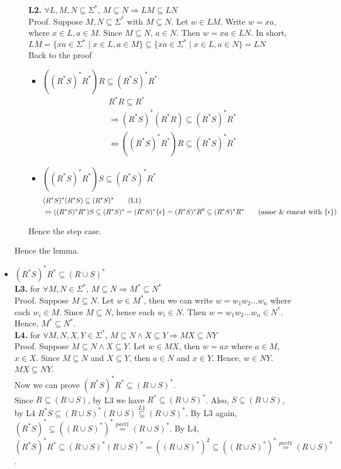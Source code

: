 \documentclass[12pt]{article}
\begin{document}
\begin{itemize}
\begin{itemize}
    \textbf{L2.} \(\forall L, M, N \subseteq \Sigma^*\), \(M \subseteq N \Rightarrow LM \subseteq LN\)\\
    Proof. Suppose \(M, N \subseteq \Sigma^*\) with \(M \subseteq N\). Let \(w \in LM\). Write \(w = xa\), where \(x \in L, a \in M\). Since \(M \subseteq N\), \(a \in N\). Then \(w = xa \in LN\). In short, \(LM = \{xa \in \Sigma^* \mid x \in L, a \in M\} \subseteq \{xa \in \Sigma^* \mid x \in L, a \in N\} = LN\)\\
    Back to the proof
    \begin{itemize}
      \item \(((R^*S)^*R^*)R \subseteq (R^*S)^*R^*\)
      \begin{align*}
        &R^*R \subseteq R^* \tag*{(L1)}\\
        &\Rightarrow (R^*S)^*(R^*R) \subseteq (R^*S)^*R^* \tag*{(L2)}\\
        &\Leftrightarrow ((R^*S)^*R^*)R \subseteq (R^*S)^*R^* \tag*{(associativity)}
      \end{align*}
      \item \(((R^*S)^*R^*)S \subseteq (R^*S)^*R^*\)
      \begin{align*}
        & (R^*S)^*(R^*S) \subseteq (R^*S)^* \tag*{(L1)}\\
        &\Leftrightarrow ((R^*S)^*R^*)S \subseteq (R^*S)^* = (R^*S)^*\{\epsilon\}
        = (R^*S)^*R^0 \subseteq (R^*S)^*R^*
        \tag*{(assoc \& concat with \(\{\epsilon\}\))}
      \end{align*}
    \end{itemize}
    Hence the step case. 
  \end{itemize}
  Hence the lemma.
  \item \((R^*S)^*R^* \subseteq (R \cup S)^*\)\\
  \textbf{L3.} for \(\forall M,N \in \Sigma^*\), \(M \subseteq N \Rightarrow M^* \subseteq N^*\)\\
  Proof. Suppose \(M \subseteq N\). Let \(w \in M^*\), then we can write \(w = w_1w_2...w_n\) where each \(w_i 
  \in M\). Since \(M \subseteq N\), hence each \(w_i \in N\). Then \(w = w_1w_2...w_n \in N^*\). Hence, \(M^* \subseteq N^*\).\\
  \textbf{L4.} for \(\forall M,N,X,Y \in \Sigma^*\), \(M \subseteq N \land X \subseteq Y \Rightarrow MX \subseteq NY\)\\
  Proof. Suppose \(M \subseteq N \land X \subseteq Y\). Let \(w \in MX\), then \(w = ax\) where \(a \in M\), \(x \in X\). Since \(M \subseteq N\) and \(X \subseteq Y\), then \(a \in N\) and \(x \in Y\). Hence, \(w \in NY\). \(MX \subseteq NY\).\\
  Now we can prove \((R^*S)^*R^* \subseteq (R \cup S)^*\).\\
  Since \(R \subseteq (R \cup S)\), by L3 we have \(R^* \subseteq (R \cup S)^*\). Also, \(S \subseteq (R \cup S)\), by L4 \(R^*S \subseteq (R \cup S)^*(R \cup S) \overset{L1}{\subseteq} (R \cup S)^*\). By L3 again, \((R^*S)^* \subseteq ((R \cup S)^*)^* \overset{part 1}{=} (R \cup S)^*\). By L4, \((R^*S)^*R^* \subseteq (R \cup S)^*(R \cup S)^* = ((R \cup S)^*)^2 \subseteq ((R \cup S)^*)^* \overset{part 1}{=} (R \cup S)^*\).
\end{itemize}
\end{document}
